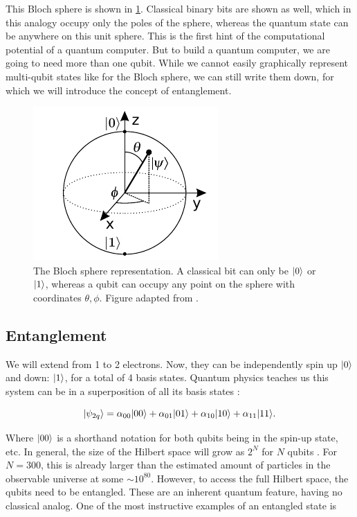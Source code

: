 This Bloch sphere is shown in \cref{fig:BlochSphere}.
Classical binary bits are shown as well, which in this analogy occupy only the poles of the sphere, whereas the quantum state can be anywhere on this unit sphere. 
This is the first hint of the computational potential of a quantum computer. 
But to build a quantum computer, we are going to need more than one qubit. 
While we cannot easily graphically represent multi-qubit states like for the Bloch sphere, we can still write them down, for which we will introduce the concept of entanglement.

\begin{figure}
	\centering
	\includegraphics[width=.28\linewidth]{figures/BlochSphereCropped.pdf}
	\caption{The Bloch sphere representation. A classical bit can only be $\lvert0\rangle$ or $\lvert1\rangle$, whereas a qubit can occupy any point on the sphere with coordinates $\theta, \phi$. Figure adapted from \cite{Jones2012}.}
	\label{fig:BlochSphere}
\end{figure}

\subsection{Entanglement}\label{sub:Entanglement}

We will extend from 1 to 2 electrons. Now, they can be independently spin up $\lvert0\rangle$ and down: $\lvert1\rangle$, for a total of 4 basis states.
Quantum physics teaches us this system can be in a superposition of all its basis states \cite{Nielsen2011}:

\begin{equation}\label{eq:TwoQubits}
	\lvert\psi_{2q}\rangle = 
	\alpha_{00} \lvert00\rangle + \alpha_{01} \lvert01\rangle + \alpha_{10} \lvert10\rangle + \alpha_{11} \lvert11\rangle.
\end{equation}

Where $\lvert00\rangle$ is a shorthand notation for both qubits being in the spin-up state, etc.
In general, the size of the Hilbert space will grow as $2^N$ for $N$ qubits \cite{Henriet2020,Nielsen2011}. 
For $N=300$, this is already larger than the estimated amount of particles in the observable universe at some $\sim 10^{80}$.
However, to access the full Hilbert space, the qubits need to be entangled. 
These are an inherent quantum feature, having no classical analog.
One of the most instructive examples of an entangled state is 

